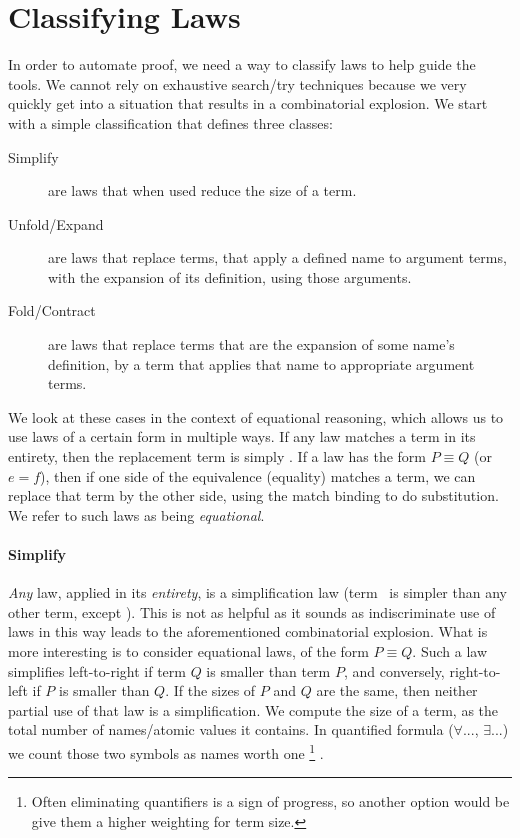 \chapter{Classifying Laws}

In order to automate proof, 
we need a way to classify laws to help guide the tools.
We cannot rely on exhaustive search/try techniques
because we very quickly get into a situation that results in a 
combinatorial explosion.
We start with a simple classification that defines three classes:

\begin{description}
    \item[Simplify]
      are laws that when used reduce the size of a term.
    \item[Unfold/Expand]
      are laws that replace terms,
      that apply a defined name to argument terms,
      with the expansion of its definition,
      using those arguments.
    \item[Fold/Contract]
      are laws that replace terms
      that are the expansion of some name's definition,
      by a term that applies that name to appropriate argument terms.
\end{description}

We look at these cases in the context of equational reasoning,
which allows us to use laws of a certain form in multiple ways.
If any law matches a term in its entirety, 
then the replacement term is simply \true.
If a law has the form $P \equiv Q$ (or $e = f$),
then if one side of the equivalence (equality) matches a term,
we can replace that term by the other side, 
using the match binding to do substitution.
We refer to such laws as being \emph{equational}.

\subsubsection*{Simplify}

\emph{Any} law, applied in its \emph{entirety}, is a simplification law
(term \true\ is simpler than any other term, except \false).
This is not as helpful as it sounds as indiscriminate use of laws
in this way leads to the aforementioned combinatorial explosion.
What is more interesting is to consider equational laws,
of the form $P \equiv Q$.
Such a law simplifies left-to-right if term $Q$ is smaller than term $P$,
and conversely, right-to-left if $P$ is smaller than $Q$.
If the sizes of $P$ and $Q$ are the same,
then neither partial use of that law is a simplification.
We compute the size of a term,
as the total number of names/atomic values it contains.
In quantified formula ($\forall ...$, $\exists ...$) 
we count those two symbols as names worth one%
\footnote{
Often eliminating quantifiers is a sign of progress, 
so another option would be give them a higher weighting for term size.
}%
.

